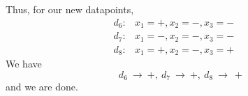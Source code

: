 \documentclass[12pt]{article} %
\begin{document}
\begin{flushleft}
\begin{enumerate}
\begin{center}
\end{center}
Thus, for our new datapoints,
	\begin{align*}
		d_6: &x_1 = +, x_2 = -, x_3 = -&&\\
		d_7: &x_1 = -, x_2 = -, x_3 = -&&\\
	   d_8: &x_1 = +, x_2 = -, x_3 = +
	\end{align*}
We have \[d_6\ \rightarrow\ +,\ d_7\ \rightarrow\ +,\ d_8\ \rightarrow\ +\] and we are done.



\end{enumerate}
\end{flushleft}
\end{document}
